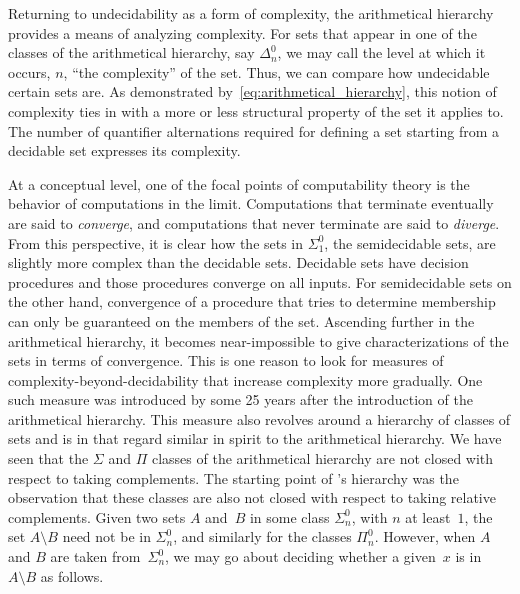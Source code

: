 Returning to undecidability as a form of complexity, the arithmetical hierarchy provides a means of analyzing complexity.
For sets that appear in one of the classes of the arithmetical hierarchy, say $\Delta^0_n$, we may call the level at which it occurs, $n$, \enquote{the complexity} of the set.
Thus, we can compare how undecidable certain sets are.
As demonstrated by~\eqref{eq:arithmetical_hierarchy}, this notion of complexity ties in with a more or less structural property of the set it applies to.
The number of quantifier alternations required for defining a set starting from a decidable set expresses its complexity.

At a conceptual level, one of the focal points of computability theory is the behavior of computations in the limit.
Computations that terminate eventually are said to \emph{converge}, and computations that never terminate are said to \emph{diverge}.
From this perspective, it is clear how the sets in $\Sigma^0_1$, the semidecidable sets, are slightly more complex than the decidable sets.
Decidable sets have decision procedures and those procedures converge on all inputs.
For semidecidable sets on the other hand, convergence of a procedure that tries to determine membership can only be guaranteed on the members of the set.
Ascending further in the arithmetical hierarchy, it becomes near-impossible to give characterizations of the sets in terms of convergence.
This is one reason to look for measures of complexity-beyond-decidability that increase complexity more gradually.
One such measure was introduced by \textcite{ershov1968hierarchyi} some 25 years after the introduction of the arithmetical hierarchy.
This measure also revolves around a hierarchy of classes of sets and is in that regard similar in spirit to the arithmetical hierarchy.
We have seen that the $\Sigma$ and $\Pi$ classes of the arithmetical hierarchy are not closed with respect to taking complements.
The starting point of \citeauthor{ershov1968hierarchyi}'s hierarchy was the observation that these classes are also not closed with respect to taking relative complements.
Given two sets $A$ and~$B$ in some class $\Sigma^0_n$, with $n$ at least~$1$, the set $A \setminus B$ need not be in $\Sigma^0_n$, and similarly for the classes $\Pi^0_n$.
However, when $A$ and $B$ are taken from~$\Sigma^0_n$, we may go about deciding whether a given~$x$ is in~$A \setminus B$ as follows.
